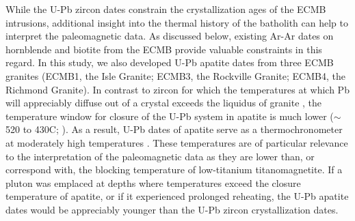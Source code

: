 \documentclass[draft]{agujournal2019}
\begin{document}
While the U-Pb zircon dates constrain the crystallization ages of the ECMB intrusions, additional insight into the thermal history of the batholith can help to interpret the paleomagnetic data. As discussed below, existing Ar-Ar dates on hornblende and biotite from the ECMB provide valuable constraints in this regard. In this study, we also developed U-Pb apatite dates from three ECMB granites (ECMB1, the Isle Granite; ECMB3, the Rockville Granite; ECMB4, the Richmond Granite). In contrast to zircon for which the temperatures at which Pb will appreciably diffuse out of a crystal exceeds the liquidus of granite \cite{Cherniak2000a}, the temperature window for closure of the U-Pb system in apatite is much lower ($\sim$ 520 to 430\textdegree C; ). As a result, U-Pb dates of apatite serve as a thermochronometer at moderately high temperatures \cite{Chamberlain2001a, Schoene2007a, Chew2015a}. These temperatures are of particular relevance to the interpretation of the paleomagnetic data as they are lower than, or correspond with, the blocking temperature of low-titanium titanomagnetite. If a pluton was emplaced at depths where temperatures exceed the closure temperature of apatite, or if it experienced prolonged reheating, the U-Pb apatite dates would be appreciably younger than the U-Pb zircon crystallization dates.
\end{document}
